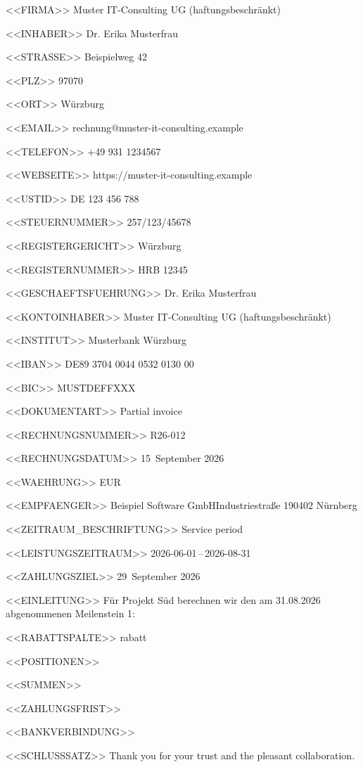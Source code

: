 <<FIRMA>>
Muster IT-Consulting UG (haftungsbeschränkt)

<<INHABER>>
Dr. Erika Musterfrau

<<STRASSE>>
Beispielweg 42

<<PLZ>>
97070

<<ORT>>
Würzburg

<<EMAIL>>
rechnung@muster-it-consulting.example

<<TELEFON>>
+49 931 1234567

<<WEBSEITE>>
https://muster-it-consulting.example

<<USTID>>
DE 123 456 788

<<STEUERNUMMER>>
257/123/45678

<<REGISTERGERICHT>>
Würzburg

<<REGISTERNUMMER>>
HRB 12345

<<GESCHAEFTSFUEHRUNG>>
Dr. Erika Musterfrau

<<KONTOINHABER>>
Muster IT-Consulting UG (haftungsbeschränkt)

<<INSTITUT>>
Musterbank Würzburg

<<IBAN>>
DE89 3704 0044 0532 0130 00

<<BIC>>
MUSTDEFFXXX

<<DOKUMENTART>>
Partial invoice

<<RECHNUNGSNUMMER>>
R26-012

<<RECHNUNGSDATUM>>
15~September 2026

<<WAEHRUNG>>
EUR

<<EMPFAENGER>>
Beispiel Software GmbH\zeilenwechsel{}Industriestraße 1\zeilenwechsel{}90402 Nürnberg

<<ZEITRAUM_BESCHRIFTUNG>>
Service period

<<LEISTUNGSZEITRAUM>>
2026-06-01\,–\,2026-08-31

<<ZAHLUNGSZIEL>>
29~September 2026

<<EINLEITUNG>>
Für Projekt Süd berechnen wir den am 31.08.2026 abgenommenen Meilenstein 1:

<<RABATTSPALTE>>
rabatt

<<POSITIONEN>>
 \positionstrenner{}
 \positionstrenner{}

<<SUMMEN>>
   \summentrenner{}

<<ZAHLUNGSFRIST>>

<<BANKVERBINDUNG>>
\bankblock{}

<<SCHLUSSSATZ>>
Thank you for your trust and the pleasant collaboration.
